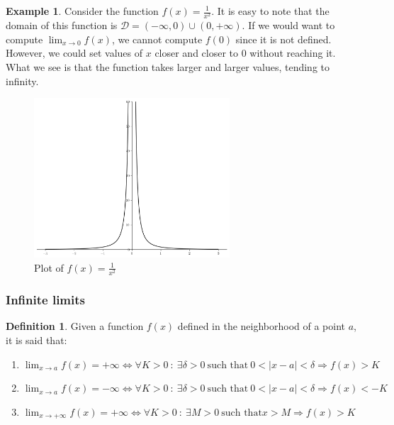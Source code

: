 \documentclass[a4paper,11pt]{article}
\theoremstyle{definition}
\newtheorem{definition}{Definition}
\newtheorem{example}{Example}
\theoremstyle{plain}
\begin{document}
\begin{example} 
Consider the function \(f(x) = \frac{1}{x^2}\). It is
easy to note that the domain of this function is
\(\mathcal{D} = (-\infty,0)\cup(0,+\infty)\). If we would want to
compute \(\lim_{x\rightarrow 0}f(x)\), we cannot compute \(f(0)\) since
it is not defined. However, we could set values of \(x\) closer and
closer to \(0\) without reaching it. What we see is that the function
takes larger and larger values, tending to infinity.
\end{example}

    \begin{figure}[htbp]
    	\centering 
    		\includegraphics[width = 0.65\textwidth]{Ch1_files/Ch1_21_0.png}
    		\caption{Plot of $f(x) = \frac{1}{x^2}$}
    		\label{fig:limit_1_over_xsquared}
    \end{figure}
    
\subsubsection{Infinite limits}\label{infinite-limits}

\begin{definition}

Given a function \(f(x)\) defined in the neighborhood of a point \(a\),
it is said that:

\begin{enumerate}
\def\labelenumi{\arabic{enumi}.}
\item
  \(\displaystyle\lim_{x\rightarrow a} f(x) = +\infty \iff \forall K > 0 \ : \ \exists\delta > 0 \ \text{such that} \ 0<\lvert x-a\rvert<\delta\Rightarrow f(x) > K\)
\item
  \(\displaystyle\lim_{x\rightarrow a} f(x) = -\infty \iff \forall K > 0 \ : \ \exists\delta > 0 \ \text{such that} \ 0<\lvert x-a\rvert<\delta\Rightarrow f(x) < -K\)
\item
  \(\displaystyle\lim_{x\rightarrow +\infty} f(x) = +\infty \iff \forall K>0 \ : \ \exists M >0 \ \text{such that} x > M \Rightarrow f(x) > K\)
\end{enumerate}
\end{definition}
\end{document}
